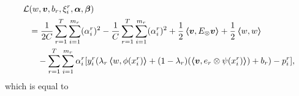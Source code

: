 \begin{equation}\nonumber
    \begin{aligned}
        \mathcal{L} & ({w}, \bm{v}, b_r, \xi_i^r, {\bm{\alpha}}, \bm{\beta})                                                                                                                                                                    \\
                    & = \frac{1}{2C} \sum_{r=1}^T \sum_{i=1}^{m_r} (\alpha_i^r)^2 - \frac{1}{C} \sum_{r=1}^T \sum_{i=1}^{m_r} (\alpha_i^r)^2 + \frac{1}{2} \bm{\left\langle} \bm{v}, E_\otimes\bm{v} \bm{\right\rangle} + \frac{1}{2} \bm{\left\langle} w, w \bm{\right\rangle}
        \\ &\quad  - \sum_{r=1}^T \sum_{i=1}^{m_r}{ \alpha_i^r [y_{i}^r (\lambda_r \bm{\left\langle} w, \phi(x_i^r) \bm{\right\rangle} + (1 - \lambda_r) (\bm{\left\langle} \bm{v}, e_r \otimes \psi({x}_i^r) \bm{\right\rangle}) + b_r) - p_{i}^r]   } ,\\
    \end{aligned}
\end{equation}
which is equal to
